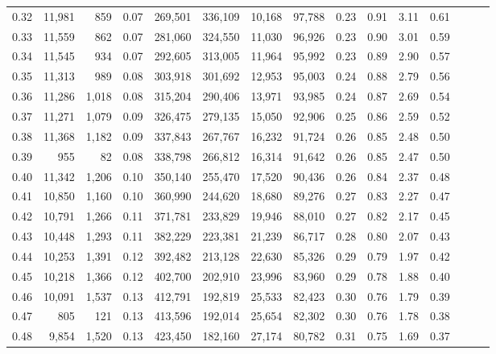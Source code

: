 \begin{tabular}{rrrrrrrrrrrrrrr}
0.32 &  11,981 &    859 &  0.07 &  269,501 &  336,109 &   10,168 &   97,788 &  0.23 &  0.91 &  3.11 &      0.61 \\
0.33 &  11,559 &    862 &  0.07 &  281,060 &  324,550 &   11,030 &   96,926 &  0.23 &  0.90 &  3.01 &      0.59 \\
0.34 &  11,545 &    934 &  0.07 &  292,605 &  313,005 &   11,964 &   95,992 &  0.23 &  0.89 &  2.90 &      0.57 \\
0.35 &  11,313 &    989 &  0.08 &  303,918 &  301,692 &   12,953 &   95,003 &  0.24 &  0.88 &  2.79 &      0.56 \\
0.36 &  11,286 &  1,018 &  0.08 &  315,204 &  290,406 &   13,971 &   93,985 &  0.24 &  0.87 &  2.69 &      0.54 \\
0.37 &  11,271 &  1,079 &  0.09 &  326,475 &  279,135 &   15,050 &   92,906 &  0.25 &  0.86 &  2.59 &      0.52 \\
0.38 &  11,368 &  1,182 &  0.09 &  337,843 &  267,767 &   16,232 &   91,724 &  0.26 &  0.85 &  2.48 &      0.50 \\
0.39 &     955 &     82 &  0.08 &  338,798 &  266,812 &   16,314 &   91,642 &  0.26 &  0.85 &  2.47 &      0.50 \\
0.40 &  11,342 &  1,206 &  0.10 &  350,140 &  255,470 &   17,520 &   90,436 &  0.26 &  0.84 &  2.37 &      0.48 \\
0.41 &  10,850 &  1,160 &  0.10 &  360,990 &  244,620 &   18,680 &   89,276 &  0.27 &  0.83 &  2.27 &      0.47 \\
0.42 &  10,791 &  1,266 &  0.11 &  371,781 &  233,829 &   19,946 &   88,010 &  0.27 &  0.82 &  2.17 &      0.45 \\
0.43 &  10,448 &  1,293 &  0.11 &  382,229 &  223,381 &   21,239 &   86,717 &  0.28 &  0.80 &  2.07 &      0.43 \\
0.44 &  10,253 &  1,391 &  0.12 &  392,482 &  213,128 &   22,630 &   85,326 &  0.29 &  0.79 &  1.97 &      0.42 \\
0.45 &  10,218 &  1,366 &  0.12 &  402,700 &  202,910 &   23,996 &   83,960 &  0.29 &  0.78 &  1.88 &      0.40 \\
0.46 &  10,091 &  1,537 &  0.13 &  412,791 &  192,819 &   25,533 &   82,423 &  0.30 &  0.76 &  1.79 &      0.39 \\
0.47 &     805 &    121 &  0.13 &  413,596 &  192,014 &   25,654 &   82,302 &  0.30 &  0.76 &  1.78 &      0.38 \\
0.48 &   9,854 &  1,520 &  0.13 &  423,450 &  182,160 &   27,174 &   80,782 &  0.31 &  0.75 &  1.69 &      0.37 \\

\end{tabular}
